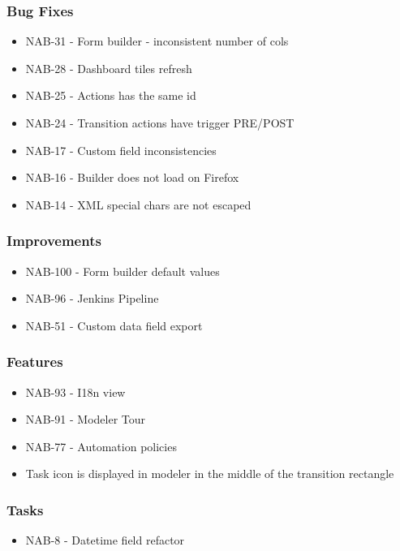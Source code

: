   \subsubsection*{Bug Fixes}
    \begin{itemize}
      \item NAB-31 - Form builder - inconsistent number of cols
      \item NAB-28 - Dashboard tiles refresh
      \item NAB-25 - Actions has the same id
      \item NAB-24 - Transition actions have trigger PRE/POST
      \item NAB-17 - Custom field inconsistencies
      \item NAB-16 - Builder does not load on Firefox
      \item NAB-14 - XML special chars are not escaped
    \end{itemize}

  \subsubsection*{Improvements}
    \begin{itemize}
      \item NAB-100 - Form builder default values
      \item NAB-96 - Jenkins Pipeline
      \item NAB-51 - Custom data field export
    \end{itemize}

  \subsubsection*{Features}
    \begin{itemize}
      \item NAB-93 - I18n view
      \item NAB-91 - Modeler Tour
      \item NAB-77 - Automation policies
      \item Task icon is displayed in modeler in the middle of the transition rectangle
    \end{itemize}

  \subsubsection*{Tasks}
    \begin{itemize}
      \item NAB-8 - Datetime field refactor
    \end{itemize}

